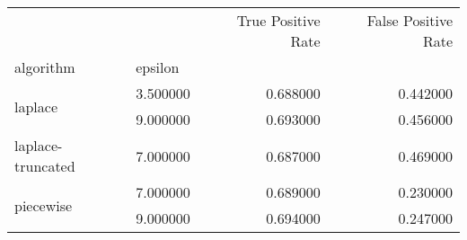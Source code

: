 \begin{tabular}{llrr}
\toprule
 &  & True Positive Rate & False Positive Rate \\
algorithm & epsilon &  &  \\
\midrule
\multirow[t]{2}{*}{laplace} & 3.500000 & 0.688000 & 0.442000 \\
 & 9.000000 & 0.693000 & 0.456000 \\
\cline{1-4}
laplace-truncated & 7.000000 & 0.687000 & 0.469000 \\
\cline{1-4}
\multirow[t]{2}{*}{piecewise} & 7.000000 & 0.689000 & 0.230000 \\
 & 9.000000 & 0.694000 & 0.247000 \\
\cline{1-4}
\bottomrule
\end{tabular}
